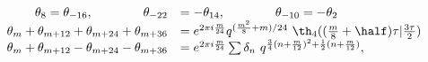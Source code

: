 \begin{equation}
  \begin{array}{rl}
\theta_8=\theta_{-16}, \qquad \qquad \theta_{-22} &= -\theta_{14},
\qquad\qquad \theta_{-10}=-\theta_{2} \\
\theta_m + \theta_{m+12} + \theta_{m+24} + \theta_{m+36} 
&= e^{2\pi i {m\over 24}} q^{({m^2\over 8} +m)/24}~ \th_4(({m\over
  8}+\half)\tau|{3\tau\over 2}) \\ 
\theta_m + \theta_{m+12} -\theta_{m+24} - \theta_{m+36} &=  e^{2\pi i
  {m\over 24}} \sum \delta_n ~q^{{3\over 4}(n+{m\over 12})^2 +{1\over
  2}(n+{m\over 12})},
\end{array}
\end{equation}

